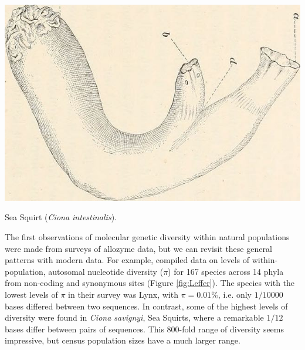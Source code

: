 \begin{marginfigure}[-1cm]
\begin{center}
\includegraphics[width= 0.8 \textwidth]{illustration_images/alleles_genotypes/Ciona_intestinalis/21016139168_2a8a57ded3_z.jpg}
\end{center}
\caption{Sea Squirt ({\it Ciona intestinalis}). } \label{fig:ciona}
\end{marginfigure}

The first observations of molecular genetic diversity within natural
populations were made from surveys of allozyme data, but we can revisit these
general patterns with modern data. For example, \citet{leffler:12} compiled
data on levels of within-population, autosomal nucleotide diversity ($\pi$) for
167 species across 14 phyla from non-coding and synonymous sites (Figure
\ref{fig:Leffer}). The species with the lowest levels of $\pi$ in their survey
was Lynx, with $\pi = 0.01\%$, i.e. only $1/10000$ bases differed between two
sequences. In contrast, some of the highest levels of diversity were found in
\textit{Ciona savignyi}, Sea Squirts, where a remarkable $1/12$ bases differ
  between pairs of sequences. This $800$-fold range of diversity seems
  impressive, but census population sizes have a much larger range.



